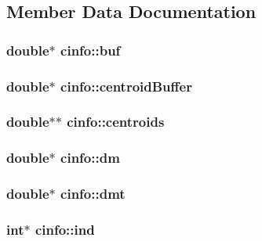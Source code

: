 \subsection{Member Data Documentation}
\hypertarget{structcinfo_aec607b45c0e5c27a565f47e87676fca9}{}
\subsubsection[{buf}]{\setlength{\rightskip}{0pt plus 5cm}double$\ast$ cinfo\+::buf}\label{structcinfo_aec607b45c0e5c27a565f47e87676fca9}
\hypertarget{structcinfo_a509c4a984293e840e4e66d7671a85025}{}
\subsubsection[{centroid\+Buffer}]{\setlength{\rightskip}{0pt plus 5cm}double$\ast$ cinfo\+::centroid\+Buffer}\label{structcinfo_a509c4a984293e840e4e66d7671a85025}
\hypertarget{structcinfo_ab40b9818006690872cd60b3f9d3c11cb}{}
\subsubsection[{centroids}]{\setlength{\rightskip}{0pt plus 5cm}double$\ast$$\ast$ cinfo\+::centroids}\label{structcinfo_ab40b9818006690872cd60b3f9d3c11cb}
\hypertarget{structcinfo_a32855d69d5411fa23aa91e015a9390f1}{}
\subsubsection[{dm}]{\setlength{\rightskip}{0pt plus 5cm}double$\ast$ cinfo\+::dm}\label{structcinfo_a32855d69d5411fa23aa91e015a9390f1}
\hypertarget{structcinfo_a4f7748234674127c29e3d2650879059b}{}
\subsubsection[{dmt}]{\setlength{\rightskip}{0pt plus 5cm}double$\ast$ cinfo\+::dmt}\label{structcinfo_a4f7748234674127c29e3d2650879059b}
\hypertarget{structcinfo_a0c1c29f2a39eb8b77ea7fdcdb3e5b83a}{}
\subsubsection[{ind}]{\setlength{\rightskip}{0pt plus 5cm}int$\ast$ cinfo\+::ind}\label{structcinfo_a0c1c29f2a39eb8b77ea7fdcdb3e5b83a}
\hypertarget{structcinfo_a80ef4ce82ee975b3d02b48a481e87eb1}{}
